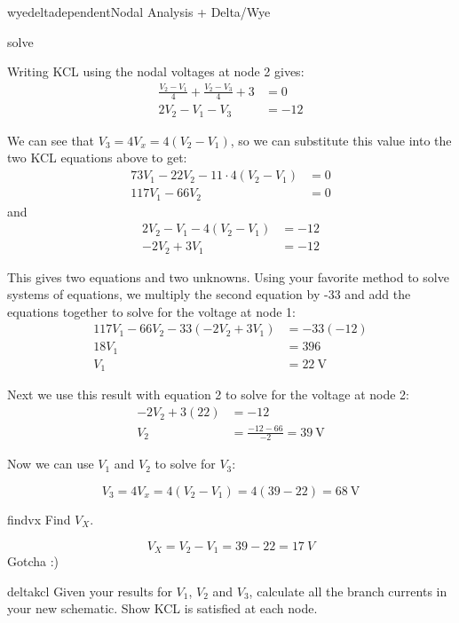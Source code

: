 \begin{mainquestion}{wyedeltadependent}{Nodal Analysis + Delta/Wye}
\begin{partquestion}{solve}
\begin{answer}
Writing KCL using the nodal voltages at node 2 gives:
\begin{align*}
\frac{V_2-V_1}{4}+\frac{V_2-V_3}{4}+3&=0 \\
2V_2 - V_1 - V_3 &= -12
\end{align*}

We can see that $V_3 = 4V_x = 4(V_2 - V_1)$, so we can substitute this value into the two KCL equations above to get:
\begin{align*}
73V_1 - 22V_2 - 11\cdot 4(V_2 - V_1)&=0 \\
117V_1 - 66V_2 &= 0
\end{align*}
and
\begin{align*}
2V_2 - V_1 - 4(V_2 - V_1) &= -12 \\
-2V_2 + 3V_1 &= -12
\end{align*}

This gives two equations and two unknowns. Using your favorite method to solve systems of equations, we multiply the second equation by -33 and add the equations together to solve for the voltage at node 1:
\begin{align*}
117V_1 - 66V_2 - 33(-2V_2 + 3V_1) &= -33(-12) \\
18V_1 &= 396 \\
V_1 &= \qty{22}{\volt}
\end{align*}

Next we use this result with equation 2 to solve for the voltage at node 2:
\begin{align*}
-2V_2 + 3(22) &= -12 \\
V_2 &= \frac{-12 - 66}{-2} = \qty{39}{\volt}
\end{align*}

Now we can use \(V_1\) and \(V_2\) to solve for \(V_3\):

\[
V_3 = 4V_x = 4(V_2 - V_1) = 4(39 - 22) = \qty{68}{\volt}
\]
\end{answer}
\end{partquestion}

\begin{partquestion}{findvx}
{Find $V_X$.}
\begin{answer}
\[V_X=V_2-V_1=39-22=\qty{17}{V}\]
Gotcha :)
\end{answer}
\end{partquestion}

\begin{partquestion}{deltakcl}
{Given your results for $V_1$, $V_2$ and $V_3$, calculate all the branch currents in your new schematic. Show KCL is satisfied at each node.}


\end{partquestion}
\end{mainquestion}
